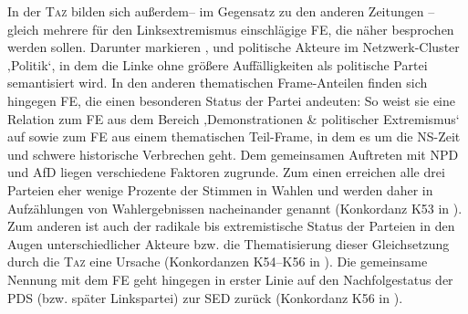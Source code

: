 In der \textsc{Taz} bilden sich außerdem-- im Gegensatz zu den anderen Zeitungen -- gleich mehrere für den Linksextremismus einschlägige FE, die näher besprochen werden sollen. Darunter markieren ,  und  politische Akteure im Netzwerk-Cluster ‚Politik`, in dem die Linke ohne größere Auffälligkeiten als politische Partei semantisiert wird. In den anderen thematischen Frame-Anteilen finden sich hingegen FE, die einen besonderen Status der Partei andeuten: So weist sie eine Relation zum FE  aus dem Bereich ‚Demonstrationen \& politischer Extremismus` auf sowie zum FE  aus einem thematischen Teil-Frame, in dem es um die NS-Zeit und schwere historische Verbrechen geht. Dem gemeinsamen Auftreten mit NPD und AfD liegen verschiedene Faktoren zugrunde. Zum einen erreichen alle drei Parteien eher wenige Prozente der Stimmen in Wahlen und werden daher in Aufzählungen von Wahlergebnissen nacheinander genannt (Konkordanz K53 in ). Zum anderen ist auch der radikale bis extremistische Status der Parteien in den Augen unterschiedlicher Akteure bzw. die Thematisierung dieser Gleichsetzung durch die \textsc{Taz} eine Ursache (Konkordanzen K54--K56 in ). Die gemeinsame Nennung mit dem FE  geht hingegen in erster Linie auf den Nachfolgestatus der PDS (bzw. später Linkspartei) zur SED zurück (Konkordanz K56 in ).

